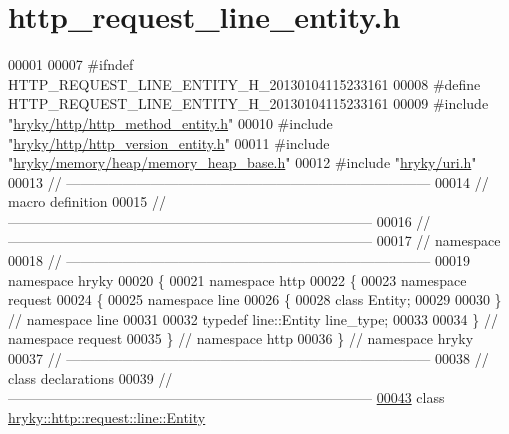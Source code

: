 \hypertarget{http__request__line__entity_8h_source}{\section{http\-\_\-request\-\_\-line\-\_\-entity.\-h}
}

\begin{DoxyCode}
00001 
00007 \textcolor{preprocessor}{#ifndef HTTP\_REQUEST\_LINE\_ENTITY\_H\_20130104115233161}
00008 \textcolor{preprocessor}{}\textcolor{preprocessor}{#define HTTP\_REQUEST\_LINE\_ENTITY\_H\_20130104115233161}
00009 \textcolor{preprocessor}{}\textcolor{preprocessor}{#include "\hyperlink{http__method__entity_8h}{hryky/http/http_method_entity.h}"}
00010 \textcolor{preprocessor}{#include "\hyperlink{http__version__entity_8h}{hryky/http/http_version_entity.h}"}
00011 \textcolor{preprocessor}{#include "\hyperlink{memory__heap__base_8h}{hryky/memory/heap/memory_heap_base.h}"}
00012 \textcolor{preprocessor}{#include "\hyperlink{uri_8h}{hryky/uri.h}"}
00013 \textcolor{comment}{//
      ------------------------------------------------------------------------------}
00014 \textcolor{comment}{// macro definition}
00015 \textcolor{comment}{//
      ------------------------------------------------------------------------------}
00016 \textcolor{comment}{//
      ------------------------------------------------------------------------------}
00017 \textcolor{comment}{// namespace}
00018 \textcolor{comment}{//
      ------------------------------------------------------------------------------}
00019 \textcolor{keyword}{namespace }hryky
00020 \{
00021 \textcolor{keyword}{namespace }http
00022 \{
00023 \textcolor{keyword}{namespace }request
00024 \{
00025 \textcolor{keyword}{namespace }line
00026 \{
00028     \textcolor{keyword}{class }Entity;
00029 
00030 \} \textcolor{comment}{// namespace line}
00031 
00032 \textcolor{keyword}{typedef} line::Entity line\_type;
00033 
00034 \} \textcolor{comment}{// namespace request}
00035 \} \textcolor{comment}{// namespace http}
00036 \} \textcolor{comment}{// namespace hryky}
00037 \textcolor{comment}{//
      ------------------------------------------------------------------------------}
00038 \textcolor{comment}{// class declarations}
00039 \textcolor{comment}{//
      ------------------------------------------------------------------------------}
\hypertarget{http__request__line__entity_8h_source_l00043}{}\hyperlink{classhryky_1_1http_1_1request_1_1line_1_1_entity}{00043} \textcolor{comment}{}\textcolor{keyword}{class }\hyperlink{classhryky_1_1http_1_1request_1_1line_1_1_entity}{hryky::http::request::line::Entity}

\end{DoxyCode}
